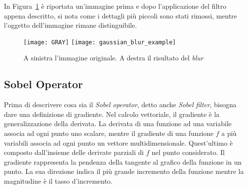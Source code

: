 In Figura~\ref{fig:gaussian_blur_example} è riportata un'immagine prima e dopo l'applicazione del filtro appena descritto, si nota come i dettagli più piccoli sono stati rimossi, mentre l'oggetto dell'immagine rimane distinguibile.

\begin{figure}[ht] %
  \begin{center}
    \texttt{[image: GRAY]}
    \texttt{[image: gaussian\_blur\_example]}
    \caption{A sinistra l'immagine originale. A destra il risultato del \textit{blur}}
    \label{fig:gaussian_blur_example}
  \end{center}
\end{figure}





\subsection {Sobel Operator}
Prima di descrivere cosa sia il \textit{Sobel operator}, detto anche \textit{Sobel filter}, bisogna dare una definizione di gradiente.
Nel calcolo vettoriale, il gradiente è la generalizzazione della derivata.
La derivata di una funzione ad una variabile associa ad ogni punto uno scalare, mentre il gradiente di una funzione $f$ a più variabili associa ad ogni punto un vettore multidimensionale.
Quest'ultimo è composto dall'insieme delle derivate parziali di $f$ nel punto considerato.
Il gradiente rappresenta la pendenza della tangente al grafico della funzione in un punto.
La sua direzione indica il più grande incremento della funzione mentre la magnitudine è il tasso d'incremento.

